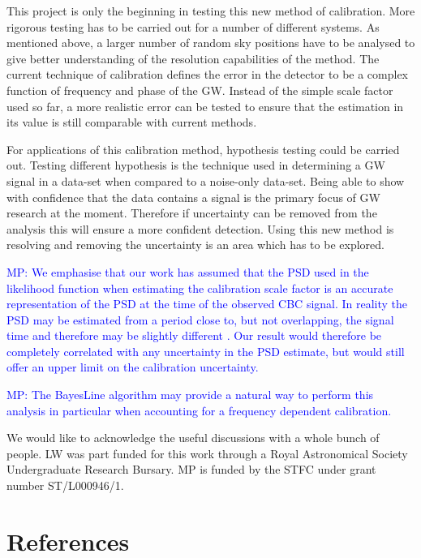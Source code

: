 \documentclass[10pt]{iopart}
\newcommand{\MP}[1]{\textcolor{blue}{MP: #1}}
\begin{document}
This project is only the beginning in testing this new method of calibration.
More rigorous testing has to be carried out for a number of different systems.
As mentioned above, a larger number of random sky positions have to be analysed
to give better understanding of the resolution capabilities of the method. The
current technique of calibration defines the error in the detector to be a
complex function of frequency and phase of the GW. Instead of the simple scale
factor used so far, a more realistic error can be tested to ensure that the
estimation in its value is still comparable with current methods.


For applications of this calibration method, hypothesis testing could be
carried out. Testing different hypothesis is the technique used in determining
a GW signal in a data-set when compared to a noise-only data-set. Being able to
show with confidence that the data contains a signal is the primary focus of GW
research at the moment. Therefore if uncertainty can be removed from the
analysis this will ensure a more confident detection. Using this new method is
resolving and removing the uncertainty is an area which has to be explored.

\MP{We emphasise that our work has assumed that the PSD used in the likelihood function
when estimating the calibration scale factor is an accurate representation of the
PSD at the time of the observed CBC signal. In reality the PSD may be estimated from
a period close to, but not overlapping, the signal time and therefore may be slightly
different \cite{2013PhRvD..88h4044L}. Our result would therefore be completely correlated
with any uncertainty in the PSD estimate, but would still offer an upper limit
on the calibration uncertainty.}

\MP{The BayesLine algorithm \cite{2015PhRvD..91h4034L} may provide a natural
way to perform this analysis in particular when accounting for a frequency
dependent calibration.}

\ack

We would like to acknowledge the useful discussions with a whole bunch
of people. LW was part funded for this work through a Royal Astronomical
Society Undergraduate Research Bursary.
MP is funded by the STFC under grant number ST/L000946/1.

\section*{References}



\end{document}
